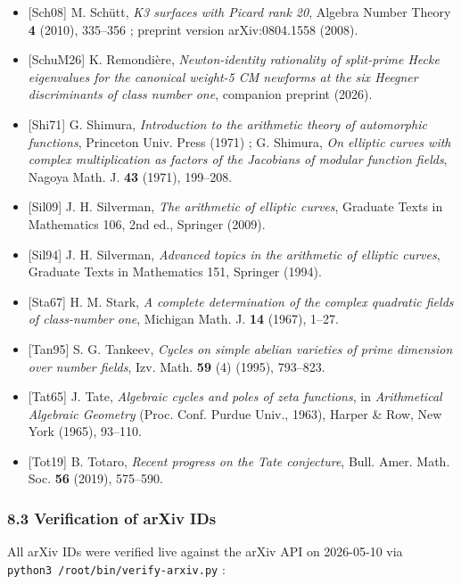 \documentclass[
  11pt,
  a4paper,
]{amsart}
\begin{document}
\begin{itemize}
\item
  {[}Sch08{]} M. Schütt, \emph{K3 surfaces with Picard rank 20}, Algebra Number Theory \textbf{4} (2010), 335--356 ; preprint version arXiv:0804.1558 (2008).
\item
  {[}SchuM26{]} K. Remondière, \emph{Newton-identity rationality of split-prime Hecke eigenvalues for the canonical weight-5 CM newforms at the six Heegner discriminants of class number one}, companion preprint (2026).
\item
  {[}Shi71{]} G. Shimura, \emph{Introduction to the arithmetic theory of automorphic functions}, Princeton Univ. Press (1971) ; G. Shimura, \emph{On elliptic curves with complex multiplication as factors of the Jacobians of modular function fields}, Nagoya Math. J. \textbf{43} (1971), 199--208.
\item
  {[}Sil09{]} J. H. Silverman, \emph{The arithmetic of elliptic curves}, Graduate Texts in Mathematics 106, 2nd ed., Springer (2009).
\item
  {[}Sil94{]} J. H. Silverman, \emph{Advanced topics in the arithmetic of elliptic curves}, Graduate Texts in Mathematics 151, Springer (1994).
\item
  {[}Sta67{]} H. M. Stark, \emph{A complete determination of the complex quadratic fields of class-number one}, Michigan Math. J. \textbf{14} (1967), 1--27.
\item
  {[}Tan95{]} S. G. Tankeev, \emph{Cycles on simple abelian varieties of prime dimension over number fields}, Izv. Math. \textbf{59} (4) (1995), 793--823.
\item
  {[}Tat65{]} J. Tate, \emph{Algebraic cycles and poles of zeta functions}, in \emph{Arithmetical Algebraic Geometry} (Proc. Conf. Purdue Univ., 1963), Harper \& Row, New York (1965), 93--110.
\item
  {[}Tot19{]} B. Totaro, \emph{Recent progress on the Tate conjecture}, Bull. Amer. Math. Soc. \textbf{56} (2019), 575--590.
\end{itemize}

\hypertarget{verification-of-arxiv-ids}{%
\subsubsection{8.3 Verification of arXiv IDs}\label{verification-of-arxiv-ids}}

All arXiv IDs were verified live against the arXiv API on 2026-05-10 via \texttt{python3\ /root/bin/verify-arxiv.py} :
\end{document}
